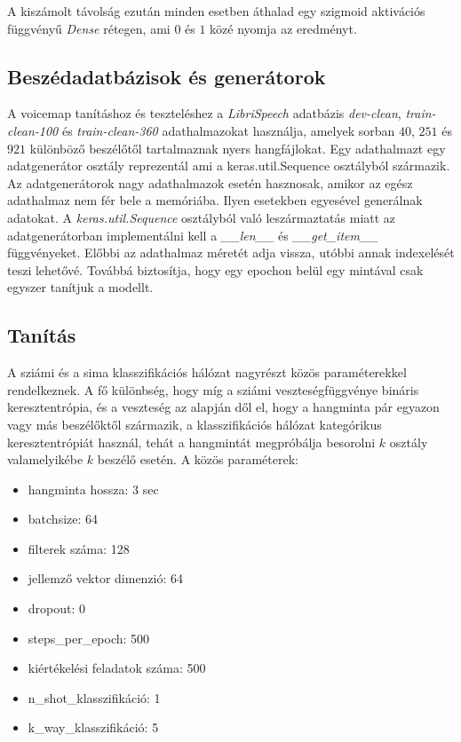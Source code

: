 A kiszámolt távolság ezután minden esetben áthalad egy szigmoid aktivációs függvényű \emph{Dense} rétegen, ami $0$ és $1$ közé nyomja az eredményt.

\subsection{Beszédadatbázisok és generátorok}

A voicemap tanításhoz és teszteléshez a \emph{LibriSpeech} adatbázis \emph{dev-clean}, \emph{train-clean-100} és \emph{train-clean-360} adathalmazokat használja, amelyek sorban $40$, $251$ és $921$ különböző beszélőtől tartalmaznak nyers hangfájlokat.
\newline
\newline
Egy adathalmazt egy adatgenerátor osztály reprezentál ami a keras.util.Sequence osztályból származik. Az adatgenerátorok nagy adathalmazok esetén hasznosak, amikor az egész adathalmaz nem fér bele a memóriába. Ilyen esetekben egyesével generálnak adatokat.
\newline
\newline
A \emph{keras.util.Sequence} osztályból való leszármaztatás miatt az adatgenerátorban implementálni kell a \emph{\_\_len\_\_} és \emph{\_\_get\_item\_\_} függvényeket. Előbbi az adathalmaz méretét adja vissza, utóbbi annak indexelését teszi lehetővé. Továbbá biztosítja, hogy egy epochon belül egy mintával csak egyszer tanítjuk a modellt.

\subsection{Tanítás}

A sziámi és a sima klasszifikációs hálózat nagyrészt közös paraméterekkel rendelkeznek. A fő különbség, hogy míg a sziámi veszteségfüggvénye bináris keresztentrópia, és a veszteség az alapján dől el, hogy a hangminta pár egyazon vagy más beszélőktől származik, a klasszifikációs hálózat kategórikus keresztentrópiát használ, tehát a hangmintát megpróbálja besorolni $k$ osztály valamelyikébe $k$ beszélő esetén. A közös paraméterek:

\begin{itemize}
	\item hangminta hossza: 3 sec
	\item batchsize: 64
	\item filterek száma: 128
	\item jellemző vektor dimenzió: 64
	\item dropout: 0
	\item steps\_per\_epoch: 500
	\item kiértékelési feladatok száma: 500
	\item n\_shot\_klasszifikáció: 1
	\item k\_way\_klasszifikáció: 5
\end{itemize}

